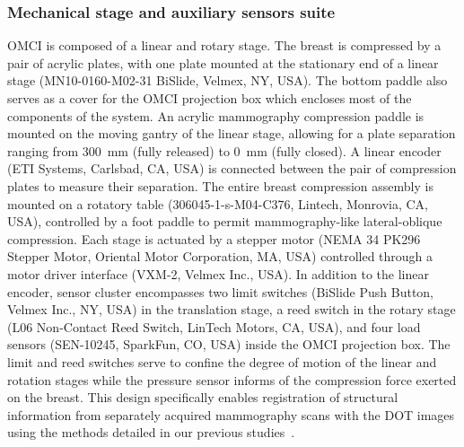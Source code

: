 \subsubsection{Mechanical stage and auxiliary sensors suite}
OMCI is composed of a linear and rotary stage. The breast is compressed by a pair of acrylic plates, with one plate mounted at the stationary end of a linear stage (MN10-0160-M02-31 BiSlide, Velmex, NY, USA). The bottom paddle also serves as a cover for the OMCI projection box which encloses most of the components of the system. An acrylic mammography compression paddle is mounted on the moving gantry of the linear stage, allowing for a plate separation ranging from 300~mm (fully released) to 0~mm (fully closed). A linear encoder (ETI Systems, Carlsbad, CA, USA) is connected between the pair of compression plates to measure their separation. The entire breast compression assembly is mounted on a rotatory table (306045-1-s-M04-C376, Lintech, Monrovia, CA, USA), controlled by a foot paddle to permit mammography-like lateral-oblique compression. Each stage is actuated by a stepper motor (NEMA 34 PK296 Stepper Motor, Oriental Motor Corporation, MA, USA) controlled through a motor driver interface (VXM-2, Velmex Inc., USA). In addition to the linear encoder, sensor cluster encompasses two limit switches (BiSlide Push Button, Velmex Inc., NY, USA) in the translation stage, a reed switch in the rotary stage (L06 Non-Contact Reed Switch, LinTech Motors, CA, USA), and four load sensors (SEN-10245, SparkFun, CO, USA) inside the OMCI projection box. The limit and reed switches serve to confine the degree of motion of the linear and rotation stages while the pressure sensor informs of the compression force exerted on the breast. This design specifically enables registration of structural information from separately acquired mammography scans with the DOT images using the methods detailed in our previous studies~\cite{Deng2015}.


